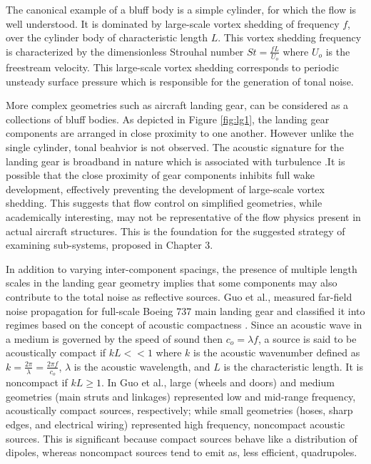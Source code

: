 The canonical example of a bluff body is a simple cylinder, for which the flow is well understood. It is dominated by large-scale vortex shedding of frequency $f$, over the cylinder body of characteristic length $L$. This vortex shedding frequency is characterized by the dimensionless Strouhal number $St = \frac{fL}{U_o}$ where $U_o $ is the freestream velocity. This large-scale vortex shedding corresponds to periodic unsteady surface pressure which is responsible for the generation of tonal noise. 
    
More complex geometries such as aircraft landing gear, can be considered as a collections of bluff bodies. As depicted in Figure \ref{fig:lg1}, the landing gear components are arranged in close proximity to one another. However unlike the single cylinder, tonal beahvior is not observed. The acoustic signature for the landing gear is broadband in nature which is associated with turbulence \cite{zawodny2009}.It is possible that the close proximity of gear components inhibits full wake development, effectively preventing the development of large-scale vortex shedding. This suggests that flow control on simplified geometries, while academically interesting, may not be representative of the flow physics present in actual aircraft structures. This is the foundation for the suggested strategy of examining sub-systems, proposed in Chapter 3. 

In addition to varying inter-component spacings, the presence of multiple length scales in the landing gear geometry implies that some components may also contribute to the total noise as reflective sources. Guo et al., measured far-field noise propagation for full-scale Boeing 737 main landing gear and classified it into regimes based on the concept of acoustic compactness \cite{guo2006}. Since an acoustic wave in a medium is governed by the speed of sound then $c_o = \lambda f$, a source is said to be acoustically compact if $kL << 1$ where $k$ is the acoustic wavenumber defined as $k = \frac{2 \pi}{\lambda} = \frac{2 \pi f}{c_o}$, $\lambda$ is the acoustic wavelength, and $L$ is the characteristic length. It is noncompact if $kL \geq 1$. In Guo et al., large (wheels and doors) and medium geometries (main struts and linkages) represented low and mid-range frequency, acoustically compact sources, respectively; while small geometries (hoses, sharp edges, and electrical wiring) represented high frequency, noncompact acoustic sources. This is significant because compact sources behave like a distribution of dipoles, whereas noncompact sources tend to emit as, less efficient, quadrupoles. 

